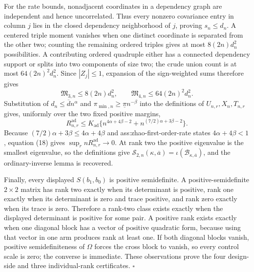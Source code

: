 For the rate bounds, nonadjacent coordinates in a dependency graph are independent and hence uncorrelated.  Thus every nonzero covariance entry in column \(j\) lies in the closed dependency neighborhood of \(j\), proving \(s_n\le d_n\).  A centered triple moment vanishes when one distinct coordinate is separated from the other two; counting the remaining ordered triples gives at most \(8(2n)d_n^2\) possibilities.  A contributing ordered quadruple either has a connected dependency support or splits into two components of size two; the crude union count is at most \(64(2n)^2d_n^2\).  Since \(|Z_j|\le1\), expansion of the sign-weighted sums therefore gives
\[
\mathfrak M_{3,n}\le8(2n)d_n^2,
\qquad
\mathfrak M_{4,n}\le64(2n)^2d_n^2.
\tag{17}
\]
Substitution of \(d_n\le\overline d n^\alpha\) and \(\pi_{\min,n}\ge\underline\pi n^{-\beta}\) into the definitions of \(U_{n,r},X_n,T_{n,r}\) gives, uniformly over the two fixed positive margins,
\[
R_{n,r}^{\mathrm{ad}}
\le K_{\mathrm{ad}}
\{n^{4\alpha+4\beta-2}
+n^{(7/2)\alpha+3\beta-2}\}.
\tag{18}
\]
Because \((7/2)\alpha+3\beta\le4\alpha+4\beta\) and ass:zhao-first-order-rate states \(4\alpha+4\beta<1\), equation (18) gives \(\sup_r nR_{n,r}^{\mathrm{ad}}\to0\).  At rank two the positive eigenvalue is the smallest eigenvalue, so the definitions give \(\mathcal S_{2,n}(\kappa,\overline a)=\iota(\mathcal B_{\kappa,\overline a})\), and the ordinary-inverse lemma is recovered.

Finally, every displayed \(S(b_1,b_0)\) is positive semidefinite.  A positive-semidefinite \(2\times2\) matrix has rank two exactly when its determinant is positive, rank one exactly when its determinant is zero and trace positive, and rank zero exactly when its trace is zero.  Therefore a rank-two class exists exactly when the displayed determinant is positive for some pair.  A positive rank exists exactly when one diagonal block has a vector of positive quadratic form, because using that vector in one arm produces rank at least one.  If both diagonal blocks vanish, positive semidefiniteness of \(\Omega\) forces the cross block to vanish, so every control scale is zero; the converse is immediate.  These observations prove the four design-side and three individual-rank certificates. \(\square\)
